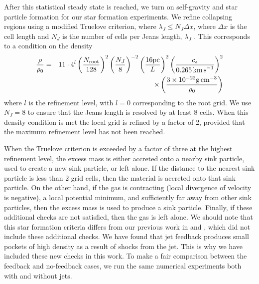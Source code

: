 \documentclass[../dissertation.tex]{subfiles}
\begin{document}
After this statistical steady state is reached, we turn on self-gravity and star particle formation for our star formation experiments. %
We refine collapsing regions using a modified Truelove criterion, where
$\lambda_J \le N_J \Delta x$, where $\Delta x$ is the cell length and $N_J$ is the number of cells per Jeans length, $\lambda_J$ \citep{1997ApJ...489L.179T}.
This corresponds to a condition on the density
%
\begin{eqnarray}
\frac{\rho}{\rho_0} &=& 11 \cdot 4^l
\left( \frac{N_{\rm root}}{128} \right)^2 \left( \frac{N_{J}}{8} \right)^{-2}
\left( \frac{16 \rm{pc}}{L} \right)^2
\left( \frac{c_s}{0.265\, {\rm km\, s}^{-1}} \right)^2\nonumber\\
&&\times\left( \frac{3 \times10^{-22} {\rm g\, cm}^{-3}}{\rho_0} \right)
\label{eq:jet_refinement_criteria}
\end{eqnarray}
%
where $l$ is the refinement level, with $l = 0$ corresponding to the root grid.
We use $N_J=8$ to ensure that the Jeans length is resolved by at least 8 cells.
When this density condition is met the local grid is refined by a factor of 2,
provided that the maximum refinement level has not been reached.

When the Truelove criterion %
is exceeded by a factor of three at the highest refinement level, the excess mass is either accreted onto a nearby sink particle, used to create a new sink particle, or left alone.
If the distance to the nearest sink particle is less than $2$ grid cells, then the material is accreted onto that sink particle.
On the other hand, if the gas is contracting (local divergence of velocity is negative), a local potential minimum, and sufficiently far away from other sink particles, then the excess mass is used to produce a sink particle.
Finally, if these additional checks are not satisfied, then the gas is left alone.
We should note that this star formation criteria differs from our previous work in \citet{2015ApJ...800...49L} and \citet{2017MNRAS.465.1316M}, which did not include these additional checks.
We have found that jet feedback produces small pockets of high density as a result of shocks from the jet.  This is why we have included these new checks in this work.
To make a fair comparison between the feedback and no-feedback cases, we run the same numerical experiments both with and without jets.
\end{document}
